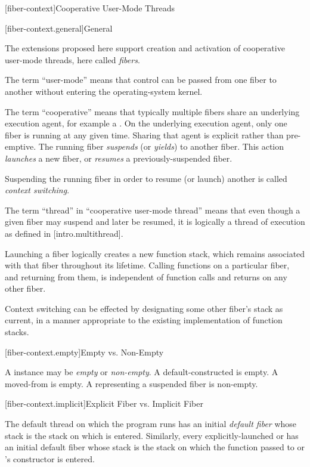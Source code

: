 \newpage

\setcounter{section}{33}
\setcounter{subsection}{6}

\label{api}

[fiber-context]{Cooperative User-Mode Threads}

[fiber-context.general]{General}

The extensions proposed here support creation and activation of cooperative
user-mode threads, here called \emph{fibers}.

The term ``user-mode'' means that control can be passed from one fiber to
another without entering the operating-system kernel.

The term ``cooperative'' means that typically multiple fibers share an
underlying execution agent, for example a . On the
underlying execution agent, only one fiber is running at any given time. Sharing
that agent is explicit rather than pre-emptive. The running
fiber \emph{suspends} (or \emph{yields}) to another fiber. This
action \emph{launches} a new fiber, or \emph{resumes} a previously-suspended
fiber.

Suspending the running fiber in order to resume (or launch) another is
called \emph{context switching}.

The term ``thread'' in ``cooperative user-mode thread'' means that even
though a given fiber may suspend and later be resumed, it is logically a
thread of execution as defined in [intro.multithread].

Launching a fiber logically creates a new function stack, which remains
associated with that fiber throughout its lifetime. Calling functions on a
particular fiber, and returning from them, is independent of function calls
and returns on any other fiber.

Context switching can be effected by designating some other fiber's stack as
current, in a manner appropriate to the existing implementation of function stacks.

[fiber-context.empty]{Empty vs. Non-Empty}

A \fiber instance may be \emph{empty} or \emph{non-empty}. A
default-constructed \fiber is empty. A moved-from \fiber is empty. A \fiber
representing a suspended fiber is non-empty.

[fiber-context.implicit]{Explicit Fiber vs. Implicit Fiber}

The default thread on which the program runs \main has an
initial \emph{default fiber} whose stack is the stack on which \main is
entered.  Similarly, every explicitly-launched
 or  has an initial default fiber whose
stack is the stack on which the function passed to  or
's constructor is entered.

